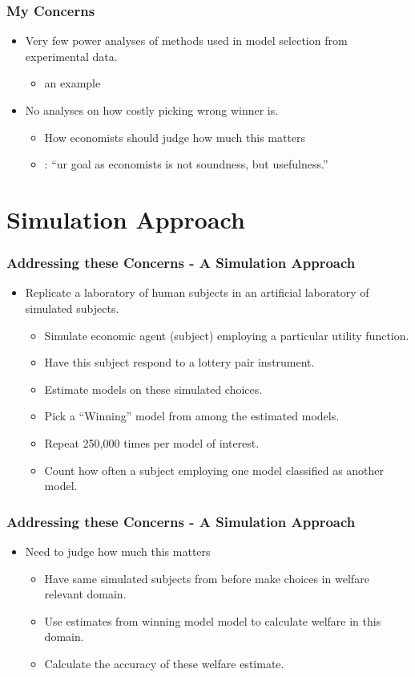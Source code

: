 \documentclass{beamer}
\begin{document}
\begin{frame}
\frametitle{My Concerns}
\begin{itemize}
	\item Very few power analyses of methods used in model selection from experimental data.
		\begin{itemize}
			\item \textcite{Wilcox2015} an example
		\end{itemize}
	\item No analyses on how costly picking wrong winner is.
		\begin{itemize}
			\item How economists should judge how much this matters
			\item \textcite[25]{Leamer2012}: \enquote{ur goal as economists is not soundness, but usefulness.}
		\end{itemize}
\end{itemize}
\end{frame}

\section{Simulation Approach}

\begin{frame}
\frametitle{Addressing these Concerns - A Simulation Approach}
\begin{itemize}
	\item Replicate a laboratory of human subjects in an artificial laboratory of simulated subjects.
		\begin{itemize}
			\item Simulate economic agent (subject) employing a particular utility function.
			\item Have this subject respond to a lottery pair instrument.
			\item Estimate models on these simulated choices.
			\item Pick a \enquote{Winning} model from among the estimated models.
			\item Repeat 250,000 times per model of interest.
			\item Count how often a subject employing one model classified as another model.
		\end{itemize}
\end{itemize}
\end{frame}

\begin{frame}
\frametitle{Addressing these Concerns - A Simulation Approach}
\begin{itemize}
	\item Need to judge how much this matters
		\begin{itemize}
			\item Have same simulated subjects from before make choices in welfare relevant domain.
			\item Use estimates from winning model model to calculate welfare in this domain.
			\item Calculate the accuracy of these welfare estimate.
		\end{itemize}
\end{itemize}
\end{frame}
\end{document}
